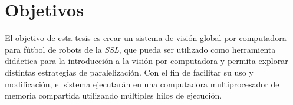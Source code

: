 
\section{Objetivos}

El objetivo de esta tesis es crear un sistema de visión global por computadora
para fútbol de robots de la \emph{SSL}, que pueda ser utilizado como herramienta
didáctica para la introducción a la visión por computadora y permita explorar
distintas estrategias de paralelización. Con el fin de facilitar su uso y
modificación, el sistema ejecutarán en una computadora multiprocesador de
memoria compartida utilizando múltiples hilos de ejecución.
